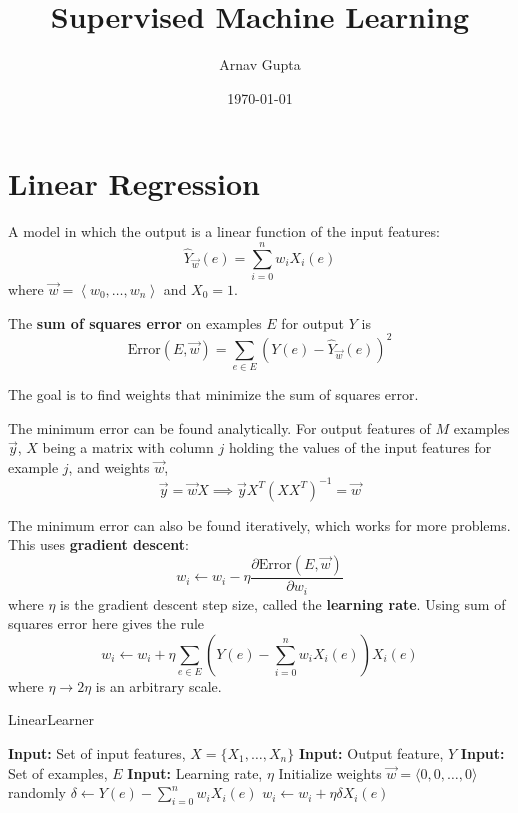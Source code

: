 \documentclass[11pt]{article}
\author{Arnav Gupta}
\date{\today}
\title{Supervised Machine Learning}
\begin{document}
\maketitle
\tableofcontents

\section{Linear Regression}
\label{sec:org988c30e}
A model in which the output is a linear function of the input features:
$$ \hat{Y}_{\vec{w}}(e) = \sum_{i=0}^{n} w_{i}X_{i}(e) $$
where \(\vec{w} = \left< w_{0}, \dots, w_{n} \right>\) and \(X_{0} = 1\).

The \textbf{sum of squares error} on examples \(E\) for output \(Y\) is
$$ \text{Error}(E, \vec{w}) = \sum_{e \in E} (Y(e) - \hat{Y}_{\vec{w}}(e))^{2} $$

The goal is to find weights that minimize the sum of squares error.

The minimum error can be found analytically.
For output features of \(M\) examples \(\vec{y}\), \(X\) being a matrix with column \(j\)
holding the values of the input features for example \(j\), and weights \(\vec{w}\),
$$ \vec{y} = \vec{w} X \implies \vec{y} X^{T} (XX^{T})^{-1} = \vec{w} $$

The minimum error can also be found iteratively, which works for more problems.
This uses \textbf{gradient descent}:
$$ w_{i} \gets w_{i} - \eta \frac{\partial \text{Error}(E, \vec{w})}{\partial w_{i}} $$
where \(\eta\) is the gradient descent step size, called the \textbf{learning rate}.
Using sum of squares error here gives the rule
$$ w_{i} \gets w_{i} + \eta \sum_{e \in E} \left( Y(e) - \sum_{i=0}^{n} w_{i} X_{i}(e) \right) X_{i}(e) $$
where \(\eta \to 2\eta\) is an arbitrary scale.

\begin{algorithm}
\caption{LinearLearner}
\begin{algorithmic}[1]
\State \textbf{Input:} Set of input features, $X = \{X_1, \dots, X_n\}$
\State \textbf{Input:} Output feature, $Y$
\State \textbf{Input:} Set of examples, $E$
\State \textbf{Input:} Learning rate, $\eta$
\State Initialize weights $\vec{w} = \langle 0, 0, \dots, 0 \rangle$ randomly
\Repeat
        \State $\delta \gets Y(e) - \sum_{i=0}^{n} w_i X_i(e)$
            \State $w_i \gets w_i + \eta \delta X_i(e)$
        \EndFor
    \EndFor
{}
\end{algorithmic}
\end{algorithm}
\end{document}
